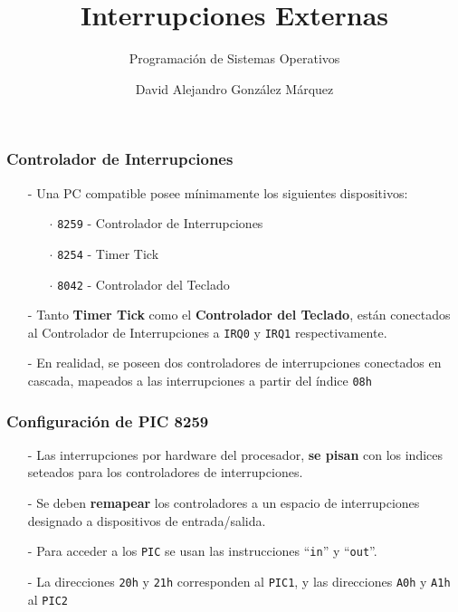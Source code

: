 \documentclass[aspectratio=169]{beamer}
\title{\Huge Interrupciones Externas}
\subtitle{Programación de Sistemas Operativos}
\author{David Alejandro González Márquez}
\institute{Departamento de Computación\\
Facultad de Ciencias Exactas y Naturales\\
Universidad de Buenos Aires}
\date{}
\begin{document}
\frame[plain]{\titlepage}

\begin{frame}
    \frametitle{Controlador de Interrupciones}
    \large
    \begin{itemize}
    \setlength\itemsep{0.8cm}
    \item[-] Una PC compatible posee mínimamente los siguientes dispositivos:
        \begin{itemize}    \large
            \item[$\cdot$] \textcolor{verdeuca}{\texttt{8259} - Controlador de Interrupciones}
            \item[$\cdot$] \textcolor{verdeuca}{\texttt{8254} - Timer Tick}
            \item[$\cdot$] \textcolor{verdeuca}{\texttt{8042} - Controlador del Teclado}
        \end{itemize}
    \pause
    \item[-] Tanto \textbf{Timer Tick} como el \textbf{Controlador del Teclado}, están conectados al Controlador de Interrupciones a \texttt{IRQ0} y \texttt{IRQ1} respectivamente.
    \pause
    \item[-] En realidad, se poseen dos controladores de interrupciones conectados en cascada, mapeados a las interrupciones a partir del índice \texttt{08h}
    \end{itemize}
\end{frame}

\begin{frame}
    \frametitle{Configuración de PIC 8259}
    \begin{itemize} \large
    \setlength\itemsep{0.6cm}
    \item[-] Las interrupciones por hardware del procesador, \textbf{se pisan} con los indices\\ seteados para los controladores de interrupciones.
    \pause
    \item[-] Se deben \textbf{remapear} los controladores a un espacio de interrupciones\\ designado a dispositivos de entrada/salida.
    \pause
    \item[-] Para acceder a los \texttt{PIC} se usan las instrucciones ``\texttt{in}'' y ``\texttt{out}''.
    \pause
    \item[-] La direcciones \texttt{20h} y \texttt{21h} corresponden al \texttt{PIC1}, y las direcciones \texttt{A0h} y \texttt{A1h} al \texttt{PIC2}
    \end{itemize}
\end{frame}
\end{document}
